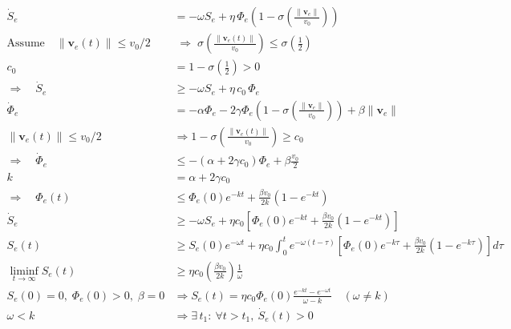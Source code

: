 \documentclass[11pt,oneside]{article}
\begin{document}
\begin{align}
\dot{S}_e
&=
-\omega S_e
+
\eta\,\Phi_e
\left(1-\sigma\!\left(\frac{\|\mathbf{v}_e\|}{v_0}\right)\right)
\\[12pt]

\text{Assume}\quad
\|\mathbf{v}_e(t)\| \le v_0/2
&\;\Rightarrow\;
\sigma\!\left(\frac{\|\mathbf{v}_e(t)\|}{v_0}\right)
\le
\sigma\!\left(\frac{1}{2}\right)
\\[10pt]

c_0
&=
1-\sigma\!\left(\frac{1}{2}\right)
> 0
\\[12pt]

\Rightarrow\quad
\dot{S}_e
&\ge
-\omega S_e
+
\eta\,c_0\,\Phi_e
\\[14pt]

\dot{\Phi}_e
&=
-\alpha\Phi_e
-
2\gamma\Phi_e
\left(1-\sigma\!\left(\frac{\|\mathbf{v}_e\|}{v_0}\right)\right)
+
\beta \|\mathbf{v}_e\|
\\[12pt]

\|\mathbf{v}_e(t)\| \le v_0/2
&\Rightarrow
1-\sigma\!\left(\frac{\|\mathbf{v}_e(t)\|}{v_0}\right)
\ge
c_0
\\[10pt]

\Rightarrow\quad
\dot{\Phi}_e
&\le
-\left(\alpha+2\gamma c_0\right)\Phi_e
+
\beta \frac{v_0}{2}
\\[14pt]

k
&=
\alpha+2\gamma c_0
\\[10pt]

\Rightarrow\quad
\Phi_e(t)
&\le
\Phi_e(0)e^{-kt}
+
\frac{\beta v_0}{2k}\left(1-e^{-kt}\right)
\\[16pt]

\dot{S}_e
&\ge
-\omega S_e
+
\eta c_0
\left[
\Phi_e(0)e^{-kt}
+
\frac{\beta v_0}{2k}\left(1-e^{-kt}\right)
\right]
\\[14pt]

S_e(t)
&\ge
S_e(0)e^{-\omega t}
+
\eta c_0
\int_0^t
e^{-\omega(t-\tau)}
\left[
\Phi_e(0)e^{-k\tau}
+
\frac{\beta v_0}{2k}\left(1-e^{-k\tau}\right)
\right]d\tau
\\[16pt]

\liminf_{t\to\infty} S_e(t)
&\ge
\eta c_0
\left(
\frac{\beta v_0}{2k}
\right)
\frac{1}{\omega}
\\[14pt]

S_e(0)=0,\;\Phi_e(0)>0,\;\beta=0
&\Rightarrow
S_e(t)
=
\eta c_0\Phi_e(0)\frac{e^{-kt}-e^{-\omega t}}{\omega-k}
\quad(\omega\ne k)
\\[14pt]

\omega < k
&\Rightarrow
\exists\, t_1:\ \forall t>t_1,\ \dot{S}_e(t)>0
\end{align}
\end{document}

